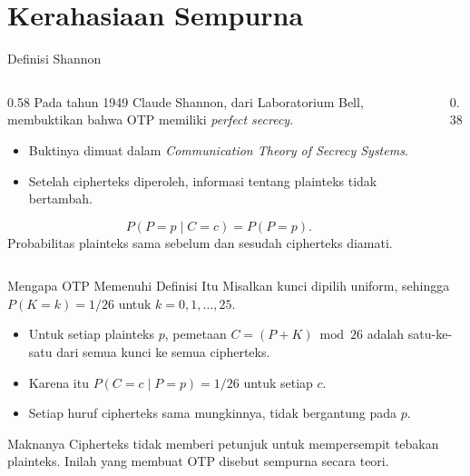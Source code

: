 \documentclass[aspectratio=169,11pt]{beamer}
\begin{document}
\section{Kerahasiaan Sempurna}

\begin{frame}{Definisi Shannon}
    \begin{columns}[T,onlytextwidth]
        \begin{column}{0.58\textwidth}
            \footnotesize
            Pada tahun 1949 Claude Shannon, dari Laboratorium Bell,
            membuktikan bahwa OTP memiliki \emph{perfect secrecy}.
            \begin{itemize}
                \item Buktinya dimuat dalam \emph{Communication Theory of
                      Secrecy Systems}.
                \item Setelah cipherteks diperoleh, informasi tentang
                      plainteks tidak bertambah.
            \end{itemize}
            \[
                P(P=p \mid C=c) = P(P=p).
            \]
            Probabilitas plainteks sama sebelum dan sesudah cipherteks
            diamati.
        \end{column}
        \begin{column}{0.38\textwidth}
            \centering
        \end{column}
    \end{columns}
\end{frame}

\begin{frame}{Mengapa OTP Memenuhi Definisi Itu}
    \footnotesize
    Misalkan kunci dipilih uniform, sehingga $P(K=k)=1/26$ untuk
    $k=0,1,\dots,25$.
    \begin{itemize}
        \item Untuk setiap plainteks $p$, pemetaan $C=(P+K)\bmod 26$
              adalah satu-ke-satu dari semua kunci ke semua cipherteks.
        \item Karena itu $P(C=c \mid P=p)=1/26$ untuk setiap $c$.
        \item Setiap huruf cipherteks sama mungkinnya, tidak bergantung
              pada $p$.
    \end{itemize}
    \vspace{0.15cm}
    \begin{exampleblock}{Maknanya}
        Cipherteks tidak memberi petunjuk untuk mempersempit tebakan
        plainteks. Inilah yang membuat OTP disebut sempurna secara teori.
    \end{exampleblock}
\end{frame}
\end{document}
